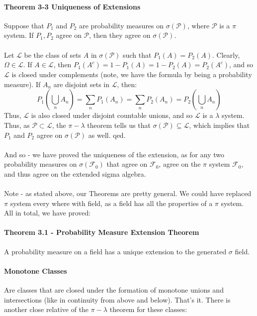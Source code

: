 \documentclass[12pt,a4paper]{article}
\newcommand{\1}[1]{\mathbbm{1}\left\{ #1 \right\}}
\newcommand{\lcal}{\mathcal{L}}
\newcommand{\fcal}{\mathcal{F}}
\newcommand{\pcal}{\mathcal{P}}
\begin{document}
\paragraph{Theorem 3-3 Uniqueness of Extensions} Suppose that $P_1$ and $P_2$ are probability measures on $\sigma(\pcal)$, where $\pcal$ is a $\pi$ system. If $P_1,P_2$ agree on $\pcal$, then they agree on $\sigma(\pcal)$.
\\\\
Let $\lcal$ be the class of sets $A$ in $\sigma(\pcal)$ such that $P_1(A) = P_2(A)$. Clearly, $\Omega \in \lcal$. If $A \in \lcal$, then $P_1(A^c) = 1 - P_1(A) = 1 - P_2(A) = P_2(A^c)$, and so $\lcal$ is closed under complements (note, we have the formula by being a probability measure). If $A_n$ are disjoint sets in $\lcal$, then:
$$
	P_1(\bigcup_n A_n) = \sum_n P_1(A_n) = \sum_n P_2(A_n) = P_2(\bigcup_n A_n)
$$
Thus, $\lcal$ is also closed under disjoint countable unions, and so $\lcal$ is a $\lambda$ system. Thus, as $\pcal \subset \lcal$, the $\pi-\lambda$ theorem tells us that $\sigma(\pcal) \subseteq \lcal$, which implies that $P_1$ and $P_2$ agree on $\sigma(\pcal)$ as well. qed.
\\\\
And so - we have proved the uniqueness of the extension, as for any two probability measures on $\sigma(\fcal_0)$ that agree on $\fcal_0$, agree on the $\pi$ system $\fcal_0$, and thus agree on the extended sigma algebra.
\\\\
Note - as stated above, our Theorems are pretty general. We could have replaced $\pi$ system every where with field, as a field has all the properties of a $\pi$ system. All in total, we have proved:

\paragraph{Theorem 3.1 - Probability Measure Extension Theorem} A probability measure on a field has a unique extension to the generated $\sigma$ field.

\paragraph{Monotone Classes} Are classes that are closed under the formation of monotone unions and intersections (like in continuity from above and below). That's it. There is another close relative of the $\pi-\lambda$ theorem for these classes:
\end{document}
